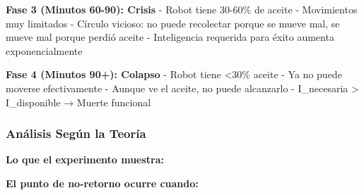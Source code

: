 \textbf{Fase 3 (Minutos 60-90): Crisis} - Robot tiene 30-60\% de aceite
- Movimientos muy limitados - Círculo vicioso: no puede recolectar
porque se mueve mal, se mueve mal porque perdió aceite - Inteligencia
requerida para éxito aumenta exponencialmente

\textbf{Fase 4 (Minutos 90+): Colapso} - Robot tiene \textless30\%
aceite - Ya no puede moverse efectivamente - Aunque ve el aceite, no
puede alcanzarlo - I\_necesaria \textgreater{} I\_disponible → Muerte
funcional

\subsubsection{Análisis Según la
Teoría}\label{anuxe1lisis-seguxfan-la-teoruxeda}

\textbf{Lo que el experimento muestra:}

\begin{Shaded}
\begin{Highlighting}[]
\OperatorTok{=}\OperatorTok{{-}}\OperatorTok{*}
\OperatorTok{=}
    
\OperatorTok{=}  \OperatorTok{/}
    
\OperatorTok{=}\OperatorTok{*}
    
\OperatorTok{=}
    
    \OperatorTok{\textgreater{}=}
    \NormalTok{:}
\end{Highlighting}
\end{Shaded}

\textbf{El punto de no-retorno ocurre cuando:}

